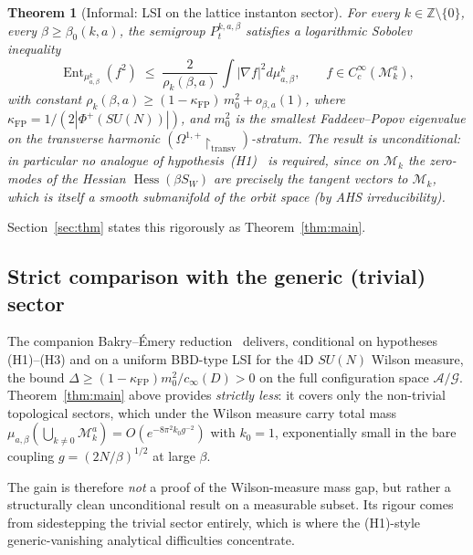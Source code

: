 \documentclass[11pt,a4paper]{amsart}
\newtheorem{theorem}{Theorem}[section]
\theoremstyle{definition}
\newcommand{\Z}{\mathbb{Z}}
\newcommand{\abs}[1]{\left\lvert#1\right\rvert}
\newcommand{\Mmod}{\mathcal{M}}
\DeclareMathOperator{\Hess}{Hess}
\DeclareMathOperator{\Ent}{Ent}
\newcommand{\kFP}{\kappa_{\mathrm{FP}}}
\newcommand{\cinf}{c_{\infty}}
\begin{document}
\begin{theorem}[Informal: LSI on the lattice instanton sector]
\label{thm:main-informal}
For every $k\in\Z\setminus\{0\}$, every $\beta\geq\beta_0(k,a)$,
the semigroup $P^{k,a,\beta}_t$ satisfies a logarithmic Sobolev inequality
$$
\Ent_{\mu^k_{a,\beta}}(f^2)
\;\leq\; \frac{2}{\rho_k(\beta,a)}\,
\int \abs{\nabla f}^2 d\mu^k_{a,\beta},
\qquad f \in C^\infty_c(\Mmod_k^a),
$$
with constant $\rho_k(\beta,a) \geq (1-\kFP)\,m_0^2 + o_{\beta,a}(1)$,
where $\kFP = 1/(2|\Phi^+(SU(N))|)$, and $m_0^2$ is the smallest
Faddeev--Popov eigenvalue on the transverse harmonic
$(\Omega^{1,+}\!\!\restriction_\mathrm{transv})$-stratum. The result is
\emph{unconditional}: in particular no analogue of
hypothesis~(H1)~\cite{RemondiereKRFP3_2026} is required, since on
$\Mmod_k$ the zero-modes of the Hessian $\Hess(\beta S_W)$ are precisely
the tangent vectors to $\Mmod_k$, which is itself a smooth submanifold of
the orbit space (by AHS irreducibility).
\end{theorem}

Section~\ref{sec:thm} states this rigorously as
Theorem~\ref{thm:main}.

\subsection{Strict comparison with the generic (trivial) sector}
The companion Bakry--\'Emery reduction~\cite{RemondiereKRFPB_2026}
delivers, conditional on hypotheses (H1)--(H3) and on a uniform BBD-type
LSI for the 4D $SU(N)$ Wilson measure, the bound
$\Delta\geq(1-\kFP)m_0^2/\cinf(D)>0$ on the full configuration space
$\mathcal A/\mathcal G$. Theorem~\ref{thm:main} above provides
\emph{strictly less}: it covers only the non-trivial topological sectors,
which under the Wilson measure carry total mass $\mu_{a,\beta}(\bigcup_{k\neq 0}
\Mmod_k^a) = O(e^{-8\pi^2 k_0 g^{-2}})$ with $k_0=1$, exponentially small
in the bare coupling $g = (2N/\beta)^{1/2}$ at large $\beta$.

The gain is therefore \emph{not} a proof of the Wilson-measure mass gap,
but rather a structurally clean unconditional result on a measurable
subset. Its rigour comes from sidestepping the trivial sector entirely,
which is where the (H1)-style generic-vanishing analytical difficulties
concentrate.
\end{document}
